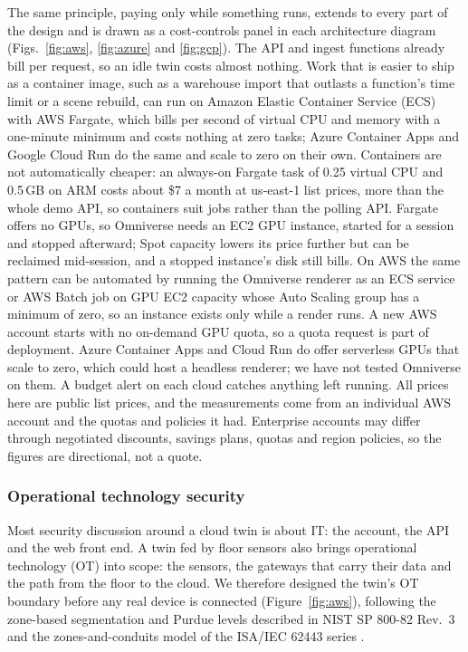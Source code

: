 \documentclass{article}
\begin{document}
The same principle, paying only while something runs, extends to every part of
the design and is drawn as a cost-controls panel in each architecture diagram
(Figs.~\ref{fig:aws}, \ref{fig:azure} and \ref{fig:gcp}). The API and ingest
functions already bill per request, so an idle twin costs almost nothing.
Work that is easier to ship as a container image, such as a warehouse import
that outlasts a function's time limit or a scene rebuild, can run on Amazon
Elastic Container Service (ECS) with AWS Fargate, which bills per second of
virtual CPU and memory with a one-minute minimum and costs nothing at zero
tasks; Azure Container Apps and Google Cloud Run do the same and scale to zero
on their own. Containers are not automatically cheaper: an always-on Fargate
task of 0.25 virtual CPU and 0.5\,GB on ARM costs about \$7 a month at
us-east-1 list prices, more than the whole demo API, so containers suit jobs
rather than the polling API. Fargate offers no GPUs, so Omniverse needs an EC2
GPU instance, started for a session and stopped afterward; Spot capacity
lowers its price further but can be reclaimed mid-session, and a stopped
instance's disk still bills. On AWS the same pattern can be automated by
running the Omniverse renderer as an ECS service or AWS Batch job on GPU EC2
capacity whose Auto Scaling group has a minimum of zero, so an instance exists
only while a render runs. A new AWS account starts with no on-demand GPU
quota, so a quota request is part of deployment. Azure Container Apps and
Cloud Run do offer serverless GPUs that scale to zero, which could host a
headless renderer; we have not tested Omniverse on them. A budget alert on
each cloud catches anything left running. All prices here are public list
prices, and the measurements come from an individual AWS account and the
quotas and policies it had. Enterprise accounts may differ through negotiated
discounts, savings plans, quotas and region policies, so the figures are
directional, not a quote.

\subsubsection*{Operational technology security}
Most security discussion around a cloud twin is about IT: the account, the
API and the web front end. A twin fed by floor sensors also brings operational
technology (OT) into scope: the sensors, the gateways that carry their data
and the path from the floor to the cloud. We therefore designed the twin's OT
boundary before any real device is connected (Figure~\ref{fig:aws}), following
the zone-based segmentation and Purdue levels described in NIST SP 800-82
Rev.~3 \cite{nist80082r3} and the zones-and-conduits model of the ISA/IEC 62443
series \cite{isa62443,iec62443_overview}.
\end{document}
